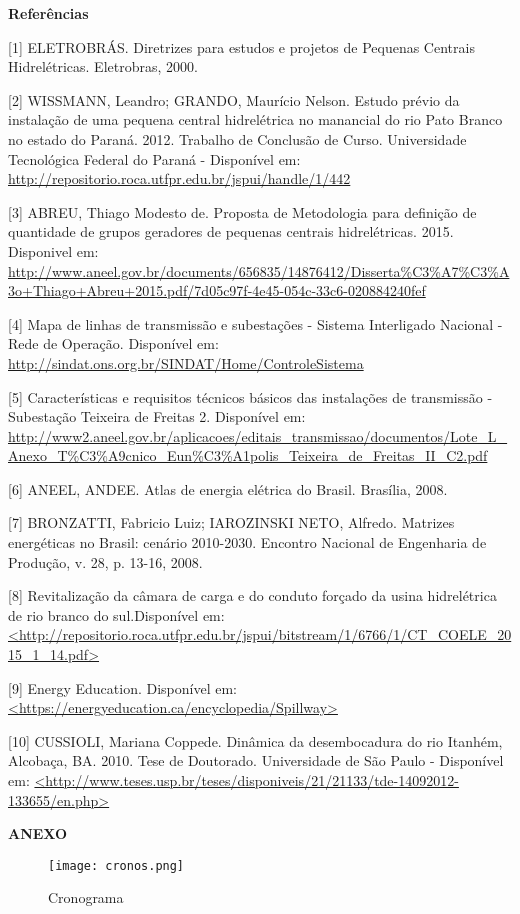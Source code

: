    \markboth{}{}
\begin{center}
	\Large \textbf{Referências}
\end{center}
	
[1] ELETROBRÁS. Diretrizes para estudos e projetos de Pequenas Centrais Hidrelétricas. Eletrobras, 2000.

[2] WISSMANN, Leandro; GRANDO, Maurício Nelson. Estudo prévio da instalação de uma pequena central hidrelétrica no manancial do rio Pato Branco no estado do Paraná. 2012. Trabalho de Conclusão de Curso. Universidade Tecnológica Federal do Paraná - Disponível em: \url{http://repositorio.roca.utfpr.edu.br/jspui/handle/1/442}

[3] ABREU, Thiago Modesto de. Proposta de Metodologia para definição de quantidade de grupos geradores de pequenas centrais hidrelétricas. 2015. Disponivel em: \url{http://www.aneel.gov.br/documents/656835/14876412/Disserta%C3%A7%C3%A3o+Thiago+Abreu+2015.pdf/7d05c97f-4e45-054c-33c6-020884240fef}

[4] Mapa de linhas de transmissão e subestações - Sistema Interligado Nacional - Rede de Operação. Disponível em:  \url{http://sindat.ons.org.br/SINDAT/Home/ControleSistema}

[5] Características e requisitos técnicos básicos das instalações de transmissão - Subestação Teixeira de Freitas 2. Disponível em: \url{http://www2.aneel.gov.br/aplicacoes/editais_transmissao/documentos/Lote_L_Anexo_T%C3%A9cnico_Eun%C3%A1polis_Teixeira_de_Freitas_II_C2.pdf}
	
[6] ANEEL, ANDEE. Atlas de energia elétrica do Brasil. Brasília, 2008.

[7] BRONZATTI, Fabricio Luiz; IAROZINSKI NETO, Alfredo. Matrizes energéticas no Brasil: cenário 2010-2030. Encontro Nacional de Engenharia de Produção, v. 28, p. 13-16, 2008.

[8] Revitalização da câmara de carga e do conduto forçado da usina hidrelétrica de rio branco do sul.Disponível em: \url{<http://repositorio.roca.utfpr.edu.br/jspui/bitstream/1/6766/1/CT_COELE_2015_1_14.pdf>}

[9] Energy Education. Disponível em: \url{<https://energyeducation.ca/encyclopedia/Spillway>}

[10] CUSSIOLI, Mariana Coppede. Dinâmica da desembocadura do rio Itanhém, Alcobaça, BA. 2010. Tese de Doutorado. Universidade de São Paulo - Disponível em: \url{<http://www.teses.usp.br/teses/disponiveis/21/21133/tde-14092012-133655/en.php>}

\newpage
\thispagestyle{empty}
\hfill
\vfill
\begin{center}
	\textbf{{\LARGE ANEXO}}
\end{center}

\vfill
\hfill

\newpage
\thispagestyle{empty}
\begin{landscape}
	\begin{figure}[h]
		\centering
		\texttt{[image: cronos.png]}
		\caption{Cronograma}
		\label{fig:cronos}
	\end{figure}
\end{landscape}
